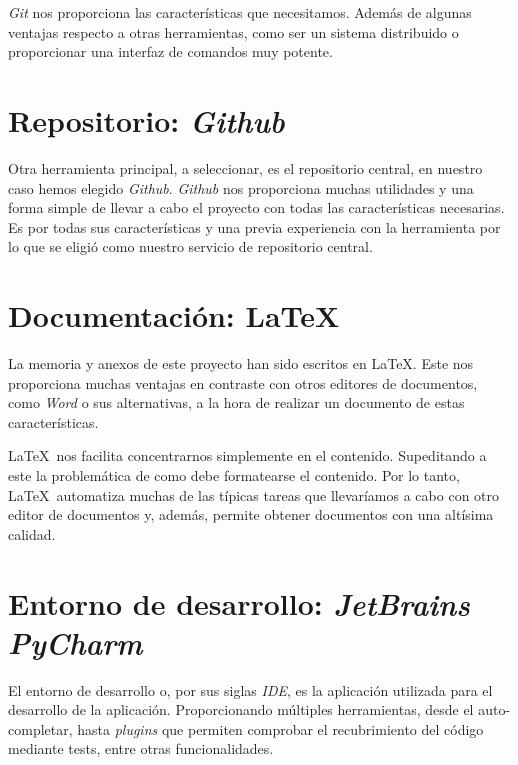 \textit{Git} nos proporciona las características que necesitamos. Además de algunas ventajas respecto a otras herramientas, como ser un sistema distribuido o proporcionar una interfaz de comandos muy potente.


\section{Repositorio: \textit{Github}}

Otra herramienta principal, a seleccionar, es el repositorio central, en nuestro caso hemos elegido \textit{Github}. \textit{Github} nos proporciona muchas utilidades y una forma simple de llevar a cabo el proyecto con todas las características necesarias. Es por todas sus características y una previa experiencia con la herramienta por lo que se eligió como nuestro servicio de repositorio central.

\section{Documentación: \LaTeX}

La memoria y anexos de este proyecto han sido escritos en \LaTeX. Este nos proporciona muchas ventajas en contraste con otros editores de documentos, como \textit{Word} o sus alternativas, a la hora de realizar un documento de estas características.

\LaTeX\ nos facilita concentrarnos simplemente en el contenido. Supeditando a este la problemática de como debe formatearse el contenido. Por lo tanto, \LaTeX\ automatiza muchas de las típicas tareas que llevaríamos a cabo con otro editor de documentos y, además, permite obtener documentos con una altísima calidad.

\section{Entorno de desarrollo: \textit{JetBrains PyCharm}}

El entorno de desarrollo o, por sus siglas \textit{IDE}, es la aplicación utilizada para el desarrollo de la aplicación. Proporcionando múltiples herramientas, desde el auto-completar, hasta \textit{plugins} que permiten comprobar el recubrimiento del código mediante tests, entre otras funcionalidades.

